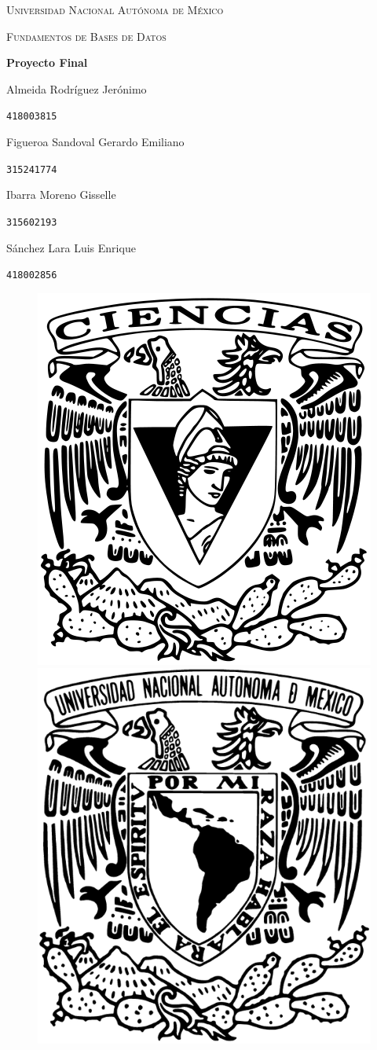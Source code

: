 \documentclass[a4paper, 12pt]{report}
\begin{document}
\begin{titlepage}
    \centering
    {\scshape\Huge Universidad Nacional Autónoma de México \par}
    \vspace{1.25cm}
    {\scshape\huge Fundamentos de Bases de Datos\par}
    \vspace{1.25cm}
    {\huge\bfseries Proyecto Final\par}
    \vspace{1.25cm}
    {\Large\textsc Almeida Rodríguez Jerónimo\par}
    \vspace{.1cm}
    {\large\texttt{418003815}\par}
    \vspace{0.25cm}
    {\Large\textsc Figueroa Sandoval Gerardo Emiliano\par}
    \vspace{.1cm}
    {\large\texttt{315241774}\par}
    \vspace{0.25cm}
    {\Large\textsc Ibarra Moreno Gisselle \par}
    \vspace{.1cm}
    {\large\texttt{315602193}\par}
    \vspace{0.25cm}
    {\Large\textsc Sánchez Lara Luis Enrique \par}
    \vspace{.1cm}
    {\large\texttt{418002856}\par}
    \vspace{1.5cm}
    \vfill
    \begin{figure}[hb!]
        \includegraphics[width=.3\textwidth]
            {../../logos/escudo_f-ciencias.png}\hfill
        \includegraphics[width=.3\textwidth]
            {../../logos/Escudo_UNAM.png}\hfill
    \end{figure}
\end{titlepage}
\end{document}
